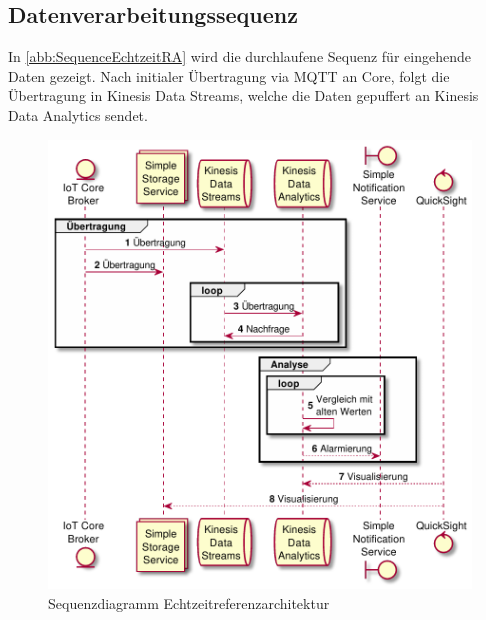 \subsection{Datenverarbeitungssequenz}
In \autoref{abb:SequenceEchtzeitRA} wird die durchlaufene Sequenz für eingehende Daten gezeigt. Nach initialer Übertragung via \ac{MQTT} an \AWSIOT{} Core, folgt die Übertragung in Kinesis Data Streams, welche die Daten gepuffert an Kinesis Data Analytics sendet. 

\begin{figure}[H]
\centering
\includegraphics[height=0.66\textheight]{graphics/echtzeit-ra.pdf}
\caption{Sequenzdiagramm Echtzeitreferenzarchitektur}
\label{abb:SequenceEchtzeitRA}
\end{figure}

